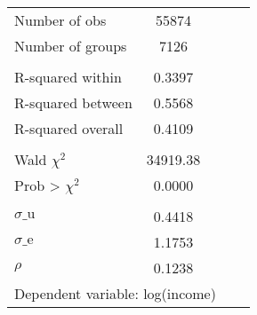 {\begin{tabular}{l*{1}{cccc}}
\midrule
Number of obs       &       55874&            &            &            \\
Number of groups    &        7126&            &            &            \\
\\ R-squared within &      0.3397&            &            &            \\
R-squared between   &      0.5568&            &            &            \\
R-squared overall   &      0.4109&            &            &            \\
\\ Wald $\chi^2$    &    34919.38&            &            &            \\
Prob > $\chi^2$     &      0.0000&            &            &            \\
\\ $\sigma\text{\_u}$&      0.4418&            &            &            \\
$\sigma\text{\_e}$   &      1.1753&            &            &            \\
$\rho$              &      0.1238&            &            &            \\
\bottomrule
\multicolumn{5}{l}{\footnotesize Dependent variable: log(income)}\\
\end{tabular}
}
